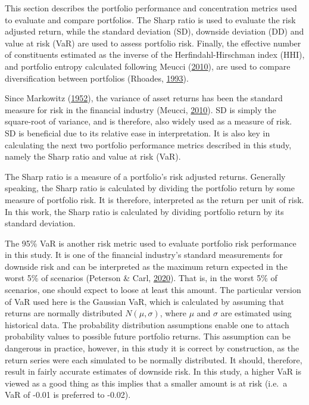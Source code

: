 \documentclass[11pt,preprint, authoryear]{elsarticle}
\numberwithin{equation}{section}
\numberwithin{figure}{section}
\numberwithin{table}{section}
\begin{document}
This section describes the portfolio performance and concentration
metrics used to evaluate and compare portfolios. The Sharp ratio is used
to evaluate the risk adjusted return, while the standard deviation (SD),
downside deviation (DD) and value at risk (VaR) are used to assess
portfolio risk. Finally, the effective number of constituents estimated
as the inverse of the Herfindahl-Hirschman index (HHI), and portfolio
entropy calculated following Meucci
(\protect\hyperlink{ref-meucci2010}{2010}), are used to compare
diversification between portfolios (Rhoades,
\protect\hyperlink{ref-rhoades1993}{1993}).

Since Markowitz (\protect\hyperlink{ref-markowitz}{1952}), the variance
of asset returns has been the standard measure for risk in the financial
industry (Meucci, \protect\hyperlink{ref-meucci2010}{2010}). SD is
simply the square-root of variance, and is therefore, also widely used
as a measure of risk. SD is beneficial due to its relative ease in
interpretation. It is also key in calculating the next two portfolio
performance metrics described in this study, namely the Sharp ratio and
value at risk (VaR).

The Sharp ratio is a measure of a portfolio's risk adjusted returns.
Generally speaking, the Sharp ratio is calculated by dividing the
portfolio return by some measure of portfolio risk. It is therefore,
interpreted as the return per unit of risk. In this work, the Sharp
ratio is calculated by dividing portfolio return by its standard
deviation.

The 95\% VaR is another risk metric used to evaluate portfolio risk
performance in this study. It is one of the financial industry's
standard measurements for downside risk and can be interpreted as the
maximum return expected in the worst 5\% of scenarios (Peterson \& Carl,
\protect\hyperlink{ref-PerformanceAnalytics}{2020}). That is, in the
worst 5\% of scenarios, one should expect to loose at least this amount.
The particular version of VaR used here is the Gaussian VaR, which is
calculated by assuming that returns are normally distributed
\(N(\mu,\sigma)\), where \(\mu\) and \(\sigma\) are estimated using
historical data. The probability distribution assumptions enable one to
attach probability values to possible future portfolio returns. This
assumption can be dangerous in practice, however, in this study it is
correct by construction, as the return series were each simulated to be
normally distributed. It should, therefore, result in fairly accurate
estimates of downside risk. In this study, a higher VaR is viewed as a
good thing as this implies that a smaller amount is at risk (i.e.~a VaR
of -0.01 is preferred to -0.02).
\end{document}
